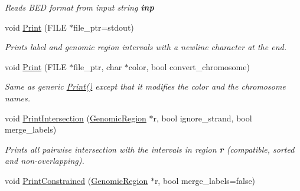 \begin{DoxyCompactItemize}
\begin{DoxyCompactList}\small\item\em Reads BED format from input string {\bfseries inp} \end{DoxyCompactList}\item 
\hypertarget{classGenomicRegionBED_affbd8eb279f10f9b45189e2388fe7e89}{
void \hyperlink{classGenomicRegionBED_affbd8eb279f10f9b45189e2388fe7e89}{Print} (FILE $\ast$file\_\-ptr=stdout)}
\label{classGenomicRegionBED_affbd8eb279f10f9b45189e2388fe7e89}

\begin{DoxyCompactList}\small\item\em Prints label and genomic region intervals with a newline character at the end. \end{DoxyCompactList}\item 
\hypertarget{classGenomicRegionBED_ae194ce2d67eafe222f10172ee376de94}{
void \hyperlink{classGenomicRegionBED_ae194ce2d67eafe222f10172ee376de94}{Print} (FILE $\ast$file\_\-ptr, char $\ast$color, bool convert\_\-chromosome)}
\label{classGenomicRegionBED_ae194ce2d67eafe222f10172ee376de94}

\begin{DoxyCompactList}\small\item\em Same as generic \hyperlink{classGenomicRegionBED_affbd8eb279f10f9b45189e2388fe7e89}{Print()} except that it modifies the color and the chromosome names. \end{DoxyCompactList}\item 
\hypertarget{classGenomicRegionBED_a04eceeb473bee498747bdd68d8ba8806}{
void \hyperlink{classGenomicRegionBED_a04eceeb473bee498747bdd68d8ba8806}{PrintIntersection} (\hyperlink{classGenomicRegion}{GenomicRegion} $\ast$r, bool ignore\_\-strand, bool merge\_\-labels)}
\label{classGenomicRegionBED_a04eceeb473bee498747bdd68d8ba8806}

\begin{DoxyCompactList}\small\item\em Prints all pairwise intersection with the intervals in region {\bfseries r} (compatible, sorted and non-\/overlapping). \end{DoxyCompactList}\item 
\hypertarget{classGenomicRegionBED_a25a8584259b6a8d47aa8c46795de1880}{
void \hyperlink{classGenomicRegionBED_a25a8584259b6a8d47aa8c46795de1880}{PrintConstrained} (\hyperlink{classGenomicRegion}{GenomicRegion} $\ast$r, bool merge\_\-labels=false)}
\label{classGenomicRegionBED_a25a8584259b6a8d47aa8c46795de1880}


\end{DoxyCompactItemize}
